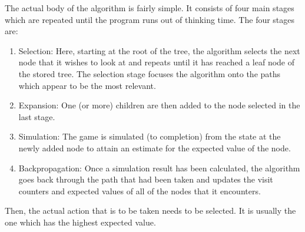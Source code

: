 


The actual body of the algorithm is fairly simple. It consists of four main stages which are repeated until the program runs out of thinking time. The four stages are:
\begin{enumerate}
\item Selection: Here, starting at the root of the tree, the algorithm selects the next node that it wishes to look at and repeats until it has reached a leaf node of the stored tree. The selection stage focuses the algorithm onto the paths which appear to be the most relevant.
\item Expansion: One (or more) children are then added to the node selected in the last stage.
\item Simulation: The game is simulated (to completion) from the state at the newly added node to attain an estimate for the expected value of the node. 
\item Backpropagation: Once a simulation result has been calculated, the algorithm goes back through the path that had been taken and updates the visit counters and expected values of all of the nodes that it encounters. 
\end{enumerate}


Then, the actual action that is to be taken needs to be selected. It is usually the one which has the highest expected value. 


